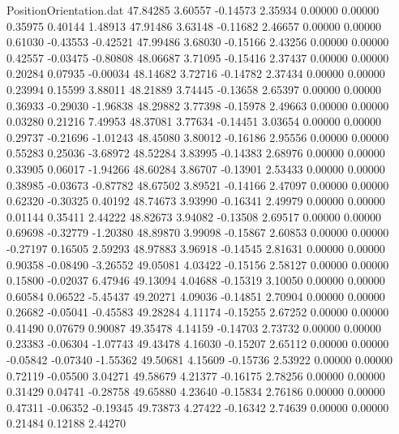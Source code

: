 \begin{filecontents}{PositionOrientation.dat}
  47.84285    3.60557   -0.14573     2.35934    0.00000    0.00000    0.35975    0.40144    1.48913
  47.91486    3.63148   -0.11682     2.46657    0.00000    0.00000    0.61030   -0.43553   -0.42521
  47.99486    3.68030   -0.15166     2.43256    0.00000    0.00000    0.42557   -0.03475   -0.80808
  48.06687    3.71095   -0.15416     2.37437    0.00000    0.00000    0.20284    0.07935   -0.00034
  48.14682    3.72716   -0.14782     2.37434    0.00000    0.00000    0.23994    0.15599    3.88011
  48.21889    3.74445   -0.13658     2.65397    0.00000    0.00000    0.36933   -0.29030   -1.96838
  48.29882    3.77398   -0.15978     2.49663    0.00000    0.00000    0.03280    0.21216    7.49953
  48.37081    3.77634   -0.14451     3.03654    0.00000    0.00000    0.29737   -0.21696   -1.01243
  48.45080    3.80012   -0.16186     2.95556    0.00000    0.00000    0.55283    0.25036   -3.68972
  48.52284    3.83995   -0.14383     2.68976    0.00000    0.00000    0.33905    0.06017   -1.94266
  48.60284    3.86707   -0.13901     2.53433    0.00000    0.00000    0.38985   -0.03673   -0.87782
  48.67502    3.89521   -0.14166     2.47097    0.00000    0.00000    0.62320   -0.30325    0.40192
  48.74673    3.93990   -0.16341     2.49979    0.00000    0.00000    0.01144    0.35411    2.44222
  48.82673    3.94082   -0.13508     2.69517    0.00000    0.00000    0.69698   -0.32779   -1.20380
  48.89870    3.99098   -0.15867     2.60853    0.00000    0.00000   -0.27197    0.16505    2.59293
  48.97883    3.96918   -0.14545     2.81631    0.00000    0.00000    0.90358   -0.08490   -3.26552
  49.05081    4.03422   -0.15156     2.58127    0.00000    0.00000    0.15800   -0.02037    6.47946
  49.13094    4.04688   -0.15319     3.10050    0.00000    0.00000    0.60584    0.06522   -5.45437
  49.20271    4.09036   -0.14851     2.70904    0.00000    0.00000    0.26682   -0.05041   -0.45583
  49.28284    4.11174   -0.15255     2.67252    0.00000    0.00000    0.41490    0.07679    0.90087
  49.35478    4.14159   -0.14703     2.73732    0.00000    0.00000    0.23383   -0.06304   -1.07743
  49.43478    4.16030   -0.15207     2.65112    0.00000    0.00000   -0.05842   -0.07340   -1.55362
  49.50681    4.15609   -0.15736     2.53922    0.00000    0.00000    0.72119   -0.05500    3.04271
  49.58679    4.21377   -0.16175     2.78256    0.00000    0.00000    0.31429    0.04741   -0.28758
  49.65880    4.23640   -0.15834     2.76186    0.00000    0.00000    0.47311   -0.06352   -0.19345
  49.73873    4.27422   -0.16342     2.74639    0.00000    0.00000    0.21484    0.12188    2.44270

\end{filecontents}
